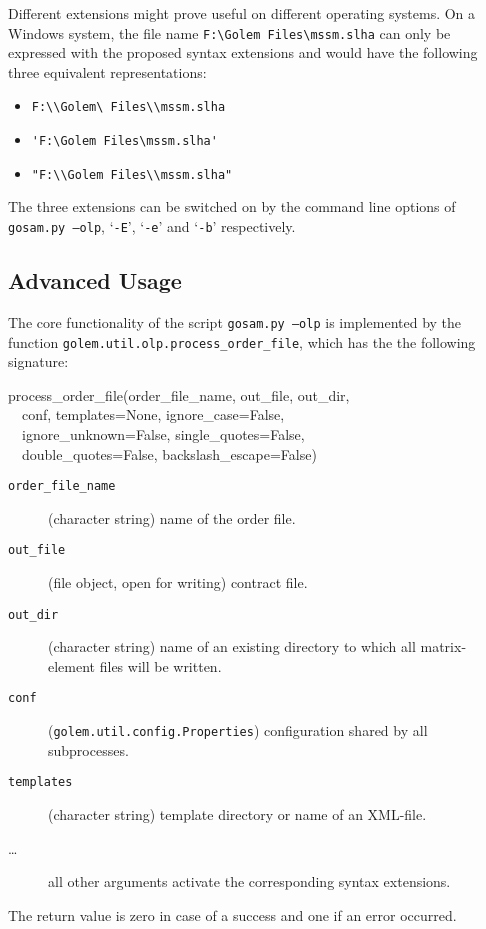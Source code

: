 \documentclass[11pt,a4paper]{refrep}
\begin{document}
Different extensions might prove useful on different operating systems.
On a Windows system, the file name \verb!F:\Golem Files\mssm.slha! can
only be expressed with the proposed syntax extensions and would have the
following three equivalent representations:
\begin{itemize}
\item \verb!F:\\Golem\ Files\\mssm.slha!
\item \verb!'F:\Golem Files\mssm.slha'!
\item \verb!"F:\\Golem Files\\mssm.slha"!
\end{itemize}

The three extensions can be switched on by the command line options
of \texttt{gosam.py --olp},
`\texttt{-E}', `\texttt{-e}' and `\texttt{-b}' respectively.

\subsection{Advanced Usage}
The core functionality of the script \texttt{gosam.py --olp} is implemented
by the function \texttt{golem.util.olp.process\_order\_file}, which has the
the following signature:
\begin{example}
process\_order\_file(order\_file\_name, out\_file, out\_dir,\\
   \ \ conf,
   templates=None,
   ignore\_case=False,\\
   \ \ ignore\_unknown=False,
   single\_quotes=False,\\
   \ \ double\_quotes=False,
   backslash\_escape=False)
\end{example}
\begin{description}
\item[\texttt{order\_file\_name}] (character string) name of the order
   file.
\item[\texttt{out\_file}] (file object, open for writing)
   contract file.
\item[\texttt{out\_dir}] (character string) name of an existing directory
   to which all matrix-element files will be written.
\item[\texttt{conf}] (\texttt{golem.util.config.Properties})
   configuration shared by all subprocesses.
\item[\texttt{templates}] (character string) template directory or
   name of an XML-file.
\item[\dots] all other arguments activate the corresponding
   syntax extensions.
\end{description}
The return value is zero in case of a success and one if an error occurred.
\end{document}
